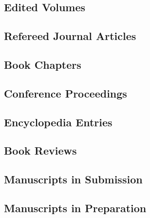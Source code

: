 \documentclass[12pt]{article}%
\begin{document}
\subsection*{Edited Volumes}
\subsection*{Refereed Journal Articles}
\subsection*{Book Chapters}
\subsection*{Conference Proceedings}
\subsection*{Encyclopedia Entries}
\subsection*{Book Reviews}
\subsection*{Manuscripts in Submission}
\subsection*{Manuscripts in Preparation}
\end{document}

